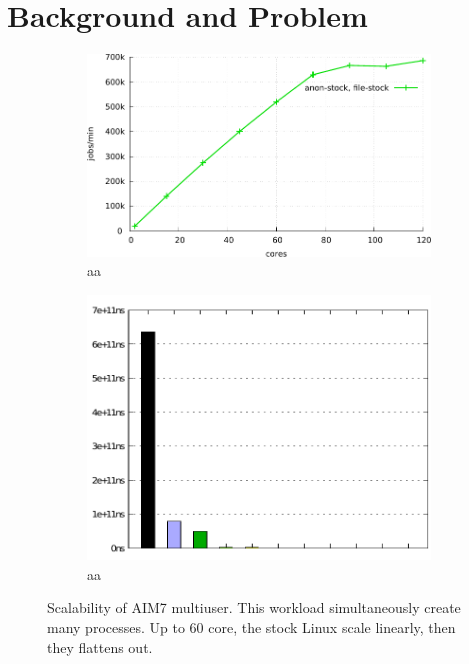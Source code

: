 \section{Background and Problem}


\begin{figure}
  \begin{subfigure}[b]{0.25\textwidth}
    \includegraphics[width=\textwidth]{graph/aim7_default}
    \caption{aa}
  \end{subfigure}%
  \begin{subfigure}[b]{0.22\textwidth}
    \includegraphics[width=\textwidth]{graph/lock_stat_anon}
    \caption{aa}
  \end{subfigure}
  \centering
  \caption{Scalability of AIM7 multiuser. This workload simultaneously create
  many processes.
  Up to 60 core, the stock Linux scale linearly, then they flattens out.}
  \label{fig:aim7_default}
\end{figure}
 
